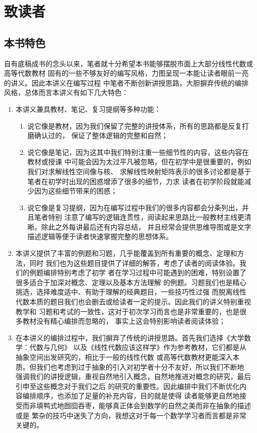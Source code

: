 \chapter*{致读者}

\section*{本书特色}
自有底稿成书的念头以来，笔者就十分希望本书能够摆脱市面上大部分线性代数或高等代数教材
固有的一些不够友好的编写风格，力图呈现一本能让读者眼前一亮的讲义。因此本讲义在编写过程
中笔者不断创新讲授思路，大胆摒弃传统的编排风格，总体而言本讲义有如下几大特色：
\begin{enumerate}
    \item 本讲义兼具教材、笔记、复习提纲等多种功能：
    \begin{enumerate}
        \item 说它像是教材，因为我们保留了完整的讲授体系，所有的思路都是反复打磨确认过的，
        保证了整体逻辑的完整和自然；
        \item 说它像是笔记，因为这其中我们特别注重一些细节性的内容，这些内容在教材或授课
        中可能会因为太过平凡被忽略，但在初学中是很重要的，例如我们对求解线性空间像与核、
        求解线性映射矩阵表示的很多讨论都是基于笔者在初学时出现的困惑增添了很多的细节，力求
        读者在初学阶段就能减少因为这些细节带来的困惑；
        \item 说它像是复习提纲，因为在编写过程中我们的很多内容都会分条列出，并且笔者特别
        注意了编写的逻辑连贯性，阅读起来思路比一般教材主线更清晰。除此之外每讲最后还有内容总结，
        并且经常会提供思维导图或是文字描述逻辑等便于读者快速掌握完整的思想体系。
    \end{enumerate}
    \item 本讲义提供了丰富的例题和习题，几乎能覆盖到所有重要的概念、定理和方法，同时
    我们也为这些题目提供了详细的解答，考虑了读者的阅读体验。我们的例题编排特别考虑了初学
    者在学习过程中可能遇到的困难，特别设置了很多适合于加深对概念、定理以及基本方法理解
    的例题。习题我们也是精心挑选，选择难度适中、有助于理解的经典题目，一些技巧性过强
    而脱离线性代数本质的题目我们也会删去或给读者一定的提示。因此我们的讲义特别重视教学和
    习题和考试的一致性，这对于初次学习而言也是非常重要的，也是很多教材没有精心编排而忽略的，
    事实上这会特别影响读者阅读体验；
    \item 在本讲义的编排过程中，我们摒弃了传统的讲授思路。首先我们选择《大学数学：代数与几何》
    以及《线性代数应该这样学》作为参考教材，它们都是从抽象空间出发研究的，相比于一般的线性代数
    或高等代数教材更能深入本质。但我们也考虑到过于抽象的引入对初学者十分不友好，所以我们不断地
    强调我们的讲授逻辑，重视自然地引入概念，自然地推进对概念的研究，最后引申至这些概念对于我们之后
    的研究的重要性。因此编排中我们不断优化内容编排顺序，也添加了足量的补充内容，目的就是使得
    读者能够更自然地接受而非填鸭式地囫囵吞枣，能够真正体会到数学的自然之美而非在抽象的描述或是
    繁杂的技巧中迷失了方向，我想这对于每一个数学学习者而言都是非常关键的。
\end{enumerate}

